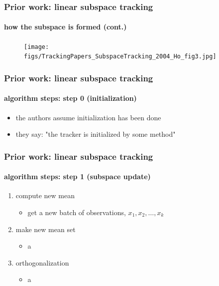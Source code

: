 \begin{frame}
\frametitle{Prior work: linear subspace tracking}
\framesubtitle{how the subspace is formed (cont.)}
\logoCSIPCPL\mypagenum
	\begin{figure}
		\texttt{[image: figs/TrackingPapers\_SubspaceTracking\_2004\_Ho\_fig3.jpg]}
	\end{figure}
\end{frame}



\begin{frame}
\frametitle{Prior work: linear subspace tracking}
\framesubtitle{algorithm steps: step 0 (initialization)}
\logoCSIPCPL\mypagenum
	\begin{itemize}
		\item the authors assume initialization has been done
		\item they say:  "the tracker is initialized by some method"
	\end{itemize}
\end{frame}



\begin{frame}
\frametitle{Prior work: linear subspace tracking}
\framesubtitle{algorithm steps: step 1 (subspace update)}
\logoCSIPCPL\mypagenum
	\begin{enumerate}
		\item {\color{blue} compute new mean}
			\begin{itemize}
				\item get a new batch of observations, $x_1, x_2, \ldots, x_k$
			\end{itemize}
		\item {\color{blue} make new mean set}
			\begin{itemize}
				\item a
			\end{itemize}
		\item {\color{blue} orthogonalization}
			\begin{itemize}
				\item a
			\end{itemize}
	\end{enumerate}
\end{frame}



